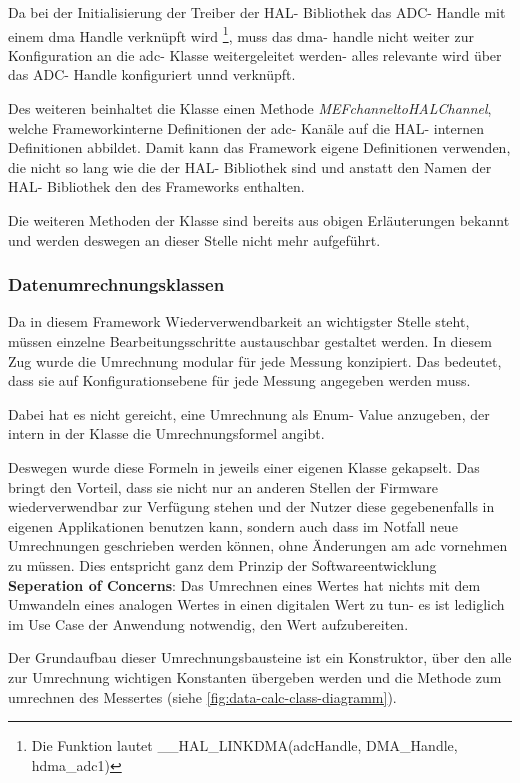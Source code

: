 Da bei der Initialisierung der Treiber der HAL- Bibliothek das ADC- Handle mit einem \ac{dma} Handle verknüpft wird \footnote{Die Funktion lautet \_\_HAL\_LINKDMA(adcHandle, DMA\_Handle, hdma\_adc1)}, muss das \ac{dma}- handle nicht weiter zur Konfiguration an die \ac{adc}- Klasse weitergeleitet werden- alles relevante wird über das ADC- Handle konfiguriert unnd verknüpft.

Des weiteren beinhaltet die Klasse einen Methode \textit{MEFchanneltoHALChannel}, welche Frameworkinterne Definitionen der \ac{adc}- Kanäle auf die HAL- internen Definitionen abbildet.
Damit kann das Framework eigene Definitionen verwenden, die nicht so lang wie die der HAL- Bibliothek sind und anstatt den Namen der HAL- Bibliothek den des Frameworks enthalten.

Die weiteren Methoden der Klasse sind bereits aus obigen Erläuterungen bekannt und werden deswegen an dieser Stelle nicht mehr aufgeführt.


\subsubsection{Datenumrechnungsklassen}
\label{subsubsec:data-calculation-classes}
Da in diesem Framework Wiederverwendbarkeit an wichtigster Stelle steht, müssen einzelne Bearbeitungsschritte austauschbar gestaltet werden.
In diesem Zug wurde die Umrechnung modular für jede Messung konzipiert.
Das bedeutet, dass sie auf Konfigurationsebene für jede Messung angegeben werden muss.

Dabei hat es nicht gereicht, eine Umrechnung als Enum- Value anzugeben, der intern in der Klasse die Umrechnungsformel angibt.

Deswegen wurde diese Formeln in jeweils einer eigenen Klasse gekapselt.
Das bringt den Vorteil, dass sie nicht nur an anderen Stellen der Firmware wiederverwendbar zur Verfügung stehen und der Nutzer diese gegebenenfalls in eigenen Applikationen benutzen kann, sondern auch  dass im Notfall neue Umrechnungen geschrieben werden können, ohne Änderungen am \ac{adc} vornehmen zu müssen.\newline
Dies entspricht ganz dem Prinzip der Softwareentwicklung \textbf{Seperation of Concerns}: Das Umrechnen eines Wertes hat nichts mit dem Umwandeln eines analogen Wertes in einen digitalen Wert zu tun- es ist lediglich im Use Case der Anwendung notwendig, den Wert aufzubereiten.

Der Grundaufbau dieser Umrechnungsbausteine ist ein Konstruktor, über den alle zur Umrechnung wichtigen Konstanten übergeben werden und die Methode zum umrechnen des Messertes (siehe \autoref{fig:data-calc-class-diagramm}).

